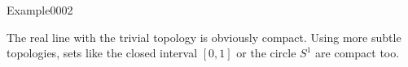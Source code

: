 
\begin{corrige}{Example0002}

	The real line with the trivial topology is obviously compact. Using more subtle topologies, sets like the closed interval $[0,1]$ or the circle $S^1$ are compact too.

\end{corrige}
